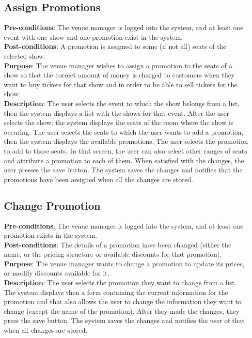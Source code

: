 \subsection{Assign Promotions}
\textbf{Pre-conditions}: The venue manager is logged into the system,
and at least one event with one show and one promotion exist in the
system.\\

\textbf{Post-conditions}: A promotion is assigned to some (if not all) seats of
the selected show.\\

\textbf{Purpose}: The venue manager wishes to assign a promotion to the
seats of a show so that the correct amount of money is charged to
customers when they want to buy tickets for that show and in order
to be able to sell tickets for the show.\\

\textbf{Description}: The user selects the event to which the show
belongs from a list, then the system displays a list with the shows
for that event. After the user selects the show, the system displays
the seats of the room where the show is occuring. The user selects
the seats to which the user wants to add a promotion, then the
system displays the available promotions. The user selects the
promotion to add to those seats. In that screen, the user can also
select other ranges of seats and attribute a promotion to each of them.
When satisfied with the changes, the user presses the save button.
The system saves the changes and notifies that the promotions have
been assigned when all the changes are stored.

\subsection{Change Promotion}
\textbf{Pre-conditions}: The venue manager is logged into the system,
and at least one promotion exists in the system.\\

\textbf{Post-conditions}: The details of a promotion have been changed
(either the name, or the pricing structure or available discounts
for that promotion).\\

\textbf{Purpose}: The venue manager wants to change a promotion to
update its prices, or modify discounts available for it.\\

\textbf{Description}: The user selects the promotion they want to
change from a list. The system displays then a form containing the
current information for the promotion and that also allows the user
to change the information they want to change (except the name of
the promotion). After they made the changes, they press the save
button. The system saves the changes and notifies the user of that
when all changes are stored.

